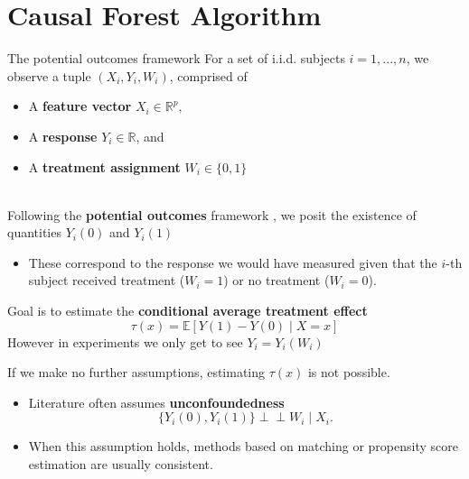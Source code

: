 \documentclass[mathserif, xcolor=table]{beamer}
\begin{document}
\section{Causal Forest Algorithm}
\begin{frame}[allowframebreaks]{The potential outcomes framework}
For a set of i.i.d. subjects $i = 1, ..., n$, we observe a tuple $(X_i , Y_i , W_i )$, comprised of
\begin{itemize}
    \item A \textbf{feature vector} $X_i \in \mathbb{R}^p,$
    \item A \textbf{response} $Y_i \in \mathbb{R}$, and 
    \item A \textbf{treatment assignment} $W_i \in \{0,1\}$\\~
\end{itemize}

Following the \textbf{potential outcomes} framework \citep{imbens2015causal} , we posit the existence of quantities $Y_i(0)$ and $Y_i(1)$ 

\begin{itemize}
    \item These correspond to the response we would have measured given that the $i$-th subject received treatment ($W_i = 1$) or no treatment ($W_i = 0$).
\end{itemize}
\framebreak
Goal is to estimate the \textbf{conditional average treatment effect}
\begin{equation*}
    \tau(x)=\mathbb{E}\left[Y(1)-Y(0)\mid X=x\right]
\end{equation*}
However in experiments we only get to see $Y_i=Y_i(W_i)$

\framebreak

If we make no further assumptions, estimating $\tau(x)$ is not possible. 
\begin{itemize}
    \item Literature often assumes \textbf{unconfoundedness} \citep{rosenbaum1983central}
\begin{equation*}
    \{Y_i(0), Y_i(1)\}\perp \!\!\! \perp W_i \mid X_i.
\end{equation*}
    \item When this assumption holds, methods based on matching or propensity score estimation are usually consistent. 
\end{itemize}
\end{frame}



\end{document}
